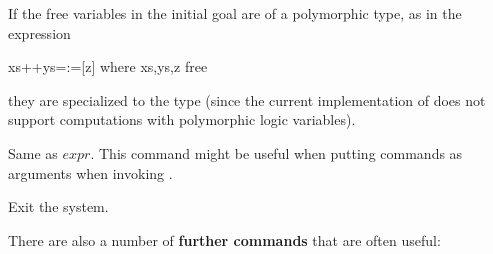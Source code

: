 \begin{description}
If the free variables in the initial goal are of a polymorphic type,
as in the expression
\begin{curry}
xs++ys=:=[z] where xs,ys,z free
\end{curry}
they are specialized to the type \ccode{()}
(since the current implementation of \CYS does not support
computations with polymorphic logic variables).

\item[\fbox{:eval $expr$}]
Same as $expr$. This command might be useful when putting
commands as arguments when invoking .


\item[\fbox{\code{:quit}}] Exit the system.
\end{description}
%
\bigskip
%
There are also a number of {\bf further commands} that are often
useful:
%
